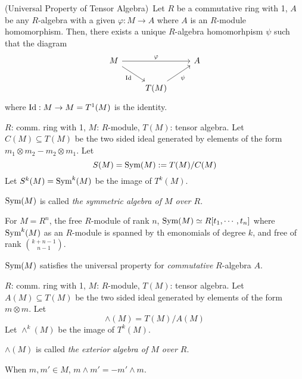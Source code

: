 \documentclass{article}
\begin{document}
\begin{theorem}(Universal Property of Tensor Algebra)\
  Let \(R\) be a commutative ring with 1,
  \(A\) be any \(R\)-algebra with a given \(\varphi: M \to A\)
  where \(A\) is an \(R\)-module homomorphism.
  Then, there exists a unique \(R\)-algebra homomorhpism \(\psi\)
  such that the diagram
  \[\begin{tikzcd}
    M \ar[swap,"\Id"]{rd} \ar["\varphi"]{rr} & & A \\
    & T(M) \ar[swap, "\psi"]{ru}
  \end{tikzcd}\]
  where \(\textnormal{Id}: M \to M = T^1(M)\) is the identity.
\end{theorem}

\begin{definition}
  \(R\): comm. ring with 1, \(M\): \(R\)-module, \(T(M)\): tensor algebra.
  Let \(C(M) \subseteq T(M)\) be the two sided ideal generated by
  elements of the form \(m_1 \otimes m_2 - m_2 \otimes m_1\).
  Let
  \[S(M) = \textnormal{Sym}(M) := T(M)/C(M)\]
  Let \(S^k(M) = \textnormal{Sym}^k(M)\) be the image of \(T^k(M)\).

  \(\textnormal{Sym}(M)\) is called \emph{the symmetric algebra of \(M\) over \(R\)}.
\end{definition}
\begin{example}
  For \(M = R^n\), the free \(R\)-module of rank \(n\),
  \(\textnormal{Sym}(M) \simeq R[t_1, \cdots, t_n]\)
  where \(\textnormal{Sym}^k(M)\) as an \(R\)-module is spanned by th emonomials of degree \(k\),
  and free of rank \({k + n - 1 \choose n - 1}\).
\end{example}

\begin{theorem}
  \(\textnormal{Sym}(M)\) satisfies the universal property for \emph{commutative} \(R\)-algebra \(A\).
\end{theorem}

\begin{definition}
  \(R\): comm. ring with 1, \(M\): \(R\)-module, \(T(M)\): tensor algebra.
  Let \(A(M) \subseteq T(M)\) be the two sided ideal generated by
  elements of the form \(m \otimes m\).
  Let
  \[\wedge(M) = T(M)/A(M)\]
  Let \(\wedge^k(M)\) be the image of \(T^k(M)\).

  \(\wedge(M)\) is called \emph{the exterior algebra of \(M\) over \(R\)}.
\end{definition}

\begin{lemma}
  When \(m, m' \in M\), \(m \wedge m' = -m' \wedge m\).
\end{lemma}
\end{document}
